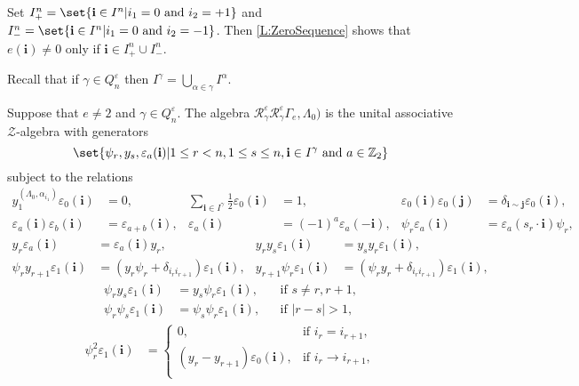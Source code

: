 \documentclass[leqno]{amsart}
\theoremstyle{plain}
\numberwithin{mainCorollary}{mainTheorem}
\numberwithin{equation}{section}
{\newaliascnt{{Assumption}}{equation}
\newtheorem{{Assumption}}[{Assumption}]{{Assumption}}
\aliascntresetthe{{Assumption}}
\expandafterautorefname\endcsname{{Assumption}}
}
{\newaliascnt{{Proposition}}{equation}
\newtheorem{{Proposition}}[{Proposition}]{{Proposition}}
\aliascntresetthe{{Proposition}}
\expandafterautorefname\endcsname{{Proposition}}
}
{\newaliascnt{{Theorem}}{equation}
\newtheorem{{Theorem}}[{Theorem}]{{Theorem}}
\aliascntresetthe{{Theorem}}
\expandafterautorefname\endcsname{{Theorem}}
}
{\newaliascnt{{Corollary}}{equation}
\newtheorem{{Corollary}}[{Corollary}]{{Corollary}}
\aliascntresetthe{{Corollary}}
\expandafterautorefname\endcsname{{Corollary}}
}
{\newaliascnt{{Conjecture}}{equation}
\newtheorem{{Conjecture}}[{Conjecture}]{{Conjecture}}
\aliascntresetthe{{Conjecture}}
\expandafterautorefname\endcsname{{Conjecture}}
}
{\newaliascnt{{Lemma}}{equation}
\newtheorem{{Lemma}}[{Lemma}]{{Lemma}}
\aliascntresetthe{{Lemma}}
\expandafterautorefname\endcsname{{Lemma}}
}
\theoremstyle{definition}
{\newaliascnt{{Definition}}{equation}
\newtheorem{{Definition}}[{Definition}]{{Definition}}
\aliascntresetthe{{Definition}}
\expandafterautorefname\endcsname{{Definition}}
}
\theoremstyle{remark}
{\newaliascnt{{Remark}}{equation}
\newtheorem{{Remark}}[{Remark}]{{Remark}}
\aliascntresetthe{{Remark}}
\expandafterautorefname\endcsname{{Remark}}
}
\let\eps=\varepsilon
\begin{document}
{{Set $I^n_+=\set{{\mathbf{i}}\in I^n|i_1=0\text{ and }i_2=+1}$ and
$I^n_-=\set{{\mathbf{i}}\in I^n|i_1=0\text{ and }i_2=-1}$. Then
\autoref{L:ZeroSequence}
shows that $e({\mathbf{i}})\ne0$ only if ${\mathbf{i}}\in I^n_+\cup I^n_-$.

Recall that if $\gamma\in{Q^\varepsilon_n}$ then $I^\gamma=\bigcup_{\alpha\in\gamma}I^\alpha$.

\begin{Definition}\label{D:RpSn}
  Suppose that $e\ne2$ and $\gamma\in{Q^\varepsilon_n}$. The algebra
  ${\mathscr{R}^\varepsilon_{\gamma}}{\mathscr{R}^\varepsilon_{\gamma}}\Gamma_e,\Lambda_0)$
  is the unital associative ${\mathcal{Z}}$-algebra with generators
  \[\set{\psi_r, y_s, \eps_a({\mathbf{i}})|1\le r<n, 1\le s\le n,
  {\mathbf{i}}\in I^\gamma\text{ and } a\in{\mathbb{Z}}_2}
  \]
  subject to the relations
  {\setlength{\abovedisplayskip}{2pt}
  \setlength{\belowdisplayskip}{1pt}
  \begin{align*}
    y_1^{(\Lambda_0,\alpha_{i_1})}\eps_0({\mathbf{i}})&= 0,
    & \textstyle\sum_{{\mathbf{i}}\in I^\gamma}\frac12\eps_0({\mathbf{i}})&= 1,
    & \eps_0({\mathbf{i}})\eps_0({\mathbf{j}})&= \delta_{{\mathbf{i}}\sim{\mathbf{j}}}\eps_0({\mathbf{i}}),\\
    \eps_a({\mathbf{i}})\eps_b({\mathbf{i}})&= \eps_{a+b}({\mathbf{i}}),
    & \eps_a({\mathbf{i}})&=(-1)^a\eps_a(-{\mathbf{i}}),
    & \psi_r\eps_a({\mathbf{i}}) &=\eps_a(s_r\cdot{\mathbf{i}})\psi_r,
  \end{align*}
  \begin{align*}
    y_r\eps_a({\mathbf{i}})&= \eps_a({\mathbf{i}})y_r, &
    y_ry_s\eps_1({\mathbf{i}})&= y_sy_r\eps_1({\mathbf{i}}),\\
    \psi_ry_{r+1}\eps_1({\mathbf{i}})&= (y_r\psi_r+\delta_{i_r i_{r+1}})\eps_1({\mathbf{i}}), &
    y_{r+1}\psi_r\eps_1({\mathbf{i}})&= (\psi_ry_r+\delta_{i_r i_{r+1}})\eps_1({\mathbf{i}}),
  \end{align*}
  \begin{align*}
    \psi_ry_s\eps_1({\mathbf{i}})&= y_s\psi_r\eps_1({\mathbf{i}}),&&\text{if }s\neq r,r+1,\\
    \psi_r\psi_s\eps_1({\mathbf{i}})&= \psi_s\psi_r\eps_1({\mathbf{i}}),&&\text{if }|r-s|>1,
  \end{align*}
  \begin{align*}
    \psi_r^2\eps_1({\mathbf{i}})&= \begin{cases}
      0,&\text{if }i_r=i_{r+1},\\
      (y_r-y_{r+1})\eps_0({\mathbf{i}}),&\text{if }i_r\to i_{r+1},\\

\end{cases}
\end{align*}}
\end{Definition}}}
\end{document}
